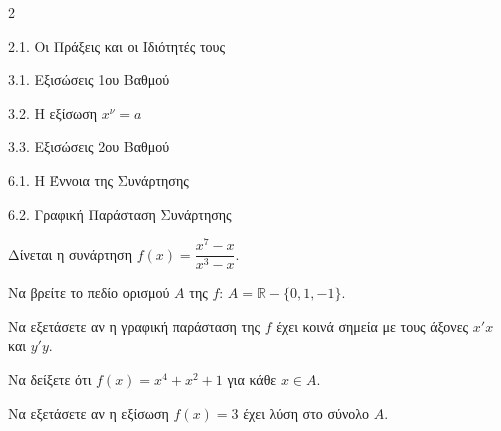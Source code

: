 \begin{ylh}{2}
    \item 2.1. Οι Πράξεις και οι Ιδιότητές τους
    \item 3.1. Εξισώσεις 1ου Βαθμού
    \item 3.2. Η εξίσωση $x^{\nu}=a$
    \item 3.3. Εξισώσεις 2ου Βαθμού
    \item 6.1. Η Έννοια της Συνάρτησης
    \item 6.2. Γραφική Παράσταση Συνάρτησης
\end{ylh}
Δίνεται η συνάρτηση $f(x) = \dfrac{x^7-x}{x^3-x}$.
\begin{alist}
\item Να βρείτε το πεδίο ορισμού $A$ της $f$: $A = \mathbb{R} - \{0, 1, -1\}$.
\item Να εξετάσετε αν η γραφική παράσταση της $f$ έχει κοινά σημεία με τους άξονες $x'x$ και $y'y$.
\item Να δείξετε ότι $f(x) = x^4+x^2+1$ για κάθε $x \in A$.
\item Να εξετάσετε αν η εξίσωση $f(x) = 3$ έχει λύση στο σύνολο $A$.
\end{alist}

